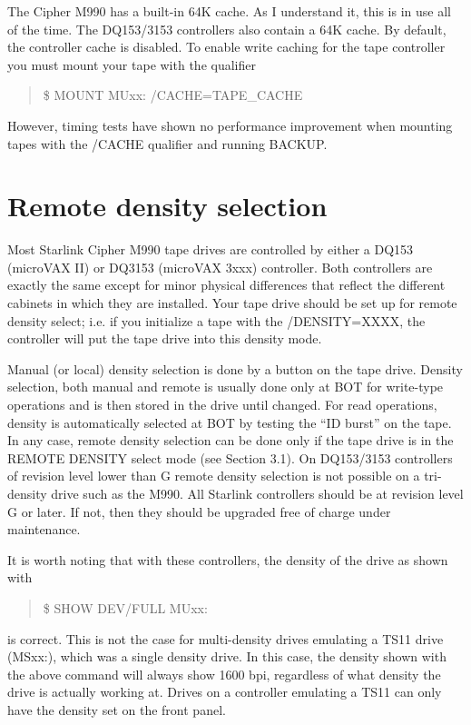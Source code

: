 The Cipher M990 has a built-in 64K cache. As I understand it, this is in use
all of the time. The DQ153/3153 controllers also contain a 64K cache. By
default, the controller cache is disabled. To enable write caching for the tape
controller you must mount your tape with the qualifier

\begin{quote}

\$ MOUNT MUxx: /CACHE=TAPE\_CACHE

\end{quote}


However, timing tests have shown no performance improvement when mounting tapes
with the /CACHE qualifier and running BACKUP.

\section{Remote density selection}

Most Starlink Cipher M990 tape drives are controlled by either a DQ153
(microVAX II) or DQ3153 (microVAX 3xxx) controller. Both controllers are
exactly the same except for minor physical differences that reflect the
different cabinets in which they are installed. Your tape drive should be set up
for remote density select; i.e. if you initialize a tape with the /DENSITY=XXXX,
the controller will put the tape drive into this  density mode.

Manual (or local) density selection is done by a button
on the tape drive. Density selection, both manual and remote is
usually done only at BOT for write-type operations and is then stored in the
drive until changed. For read operations, density is automatically selected at
BOT by testing the ``ID burst'' on the tape.
In any case, remote density selection can be
done only if the tape drive is in the REMOTE DENSITY  select mode (see Section
3.1). On
DQ153/3153 controllers of revision level lower than G remote density
selection is not possible on a tri-density drive such as the M990. All Starlink
controllers should be at revision level G or later. If not, then they should be
upgraded free of charge under maintenance.

It is worth noting that with these controllers, the density of the drive as
shown with

\begin{quote}

\$ SHOW DEV/FULL MUxx:

\end{quote}

is correct. This is not the case for multi-density drives emulating a TS11
drive (MSxx:), which was a single density drive. In this case, the density shown
with the above command will always show 1600 bpi, regardless of what density
the drive is actually working at.  Drives on a controller emulating a TS11 can
only have the density set on the front panel.


